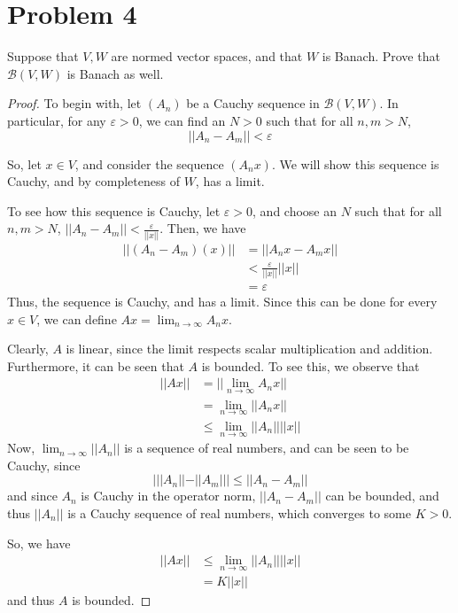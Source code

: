 \documentclass[fontsize=11pt]{scrartcl} %
\numberwithin{equation}{section} %
\numberwithin{figure}{section} %
\numberwithin{table}{section} %
\begin{document}
\section*{Problem 4}
Suppose that $V,W$ are normed vector spaces, and that $W$ is Banach. Prove that
$\mathscr{B}(V,W)$ is Banach as well.
\\
\begin{proof}
    To begin with, let $(A_n)$ be a Cauchy sequence in $\mathscr{B}(V,W)$.
    In particular, for any $\varepsilon >0$, we can find an $N>0$ such that
    for all $n,m>N$,
    \[
        ||A_n-A_m|| < \varepsilon
    \]

    So, let $x\in V$, and consider the sequence $(A_nx)$. We will show this
    sequence is Cauchy, and by completeness of $W$, has a limit.

    To see how this sequence is Cauchy, let $\varepsilon >0$, and choose an
    $N$ such that for all $n,m>N$, $||A_n-A_m||<\frac{\varepsilon}{||x||}$.
    Then, we have
    \[
        \begin{aligned}
            ||(A_n-A_m)(x)|| &=||A_nx-A_mx||\\
                            &< \frac{\varepsilon}{||x||}||x||\\
                            &=\varepsilon
        \end{aligned}
    \]
    Thus, the sequence is Cauchy, and has a limit. Since this can be done
    for every $x\in V$, we can define $Ax = \lim_{n\to\infty}A_nx$.

    Clearly, $A$ is linear, since the limit respects scalar multiplication and
    addition. Furthermore, it can be seen that $A$ is bounded. To see this, we
    observe that
    \[
        \begin{aligned}
            ||Ax|| &= ||\lim_{n\to\infty}A_nx||\\
                    &=\lim_{n\to\infty}||A_nx||\\
                    &\leq\lim_{n\to\infty}||A_n||||x||
        \end{aligned}
    \]
    Now, $\lim_{n\to\infty}||A_n||$ is a sequence of real numbers, and can be
    seen to be Cauchy, since
    \[
    |||A_n||-||A_m||| \leq ||A_n-A_m||
    \]
    and since $A_n$ is Cauchy in the operator norm, $||A_n-A_m||$ can be
    bounded, and thus $||A_n||$ is a Cauchy sequence of real numbers, which
    converges to some $K>0$.

    So, we have
    \[
        \begin{aligned}
            ||Ax|| &\leq \lim_{n\to\infty}||A_n||||x||\\
                    &= K||x||
        \end{aligned}
    \]
    and thus $A$ is bounded.


\end{proof}
\end{document}
